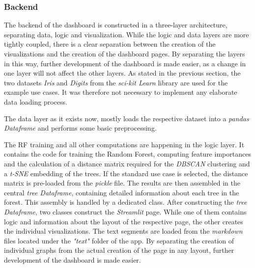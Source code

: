 \documentclass[a4paper, 12pt]{article}
\begin{document}
\subsubsection{Backend}
The backend of the dashboard is constructed in a three-layer architecture, separating data,
logic and visualization. While the logic and data layers are more tightly coupled, there is
a clear separation between the creation of the visualizations and the creation of the
dashboard pages. By separating the layers in this way, further development of the dashboard is
made easier, as a change in one layer will not affect the other layers. As stated in the
previous section, the two datasets \textit{Iris} and \textit{Digits} from the
\textit{sci-kit Learn} library are used for the example use cases. It was therefore not
necessary to implement any elaborate data loading process. \par
The data layer as it exists now, mostly loads the respective dataset into a
\textit{pandas Dataframe} and performs some basic preprocessing. \par
The RF training and all other computations are happening in the logic layer. It
contains the code for training the Random Forest, computing feature importances and the calculation
of a distance matrix required for the \textit{DBSCAN} clustering and a\textit{ t-SNE} embedding
of the trees. If the standard use case is selected, the distance matrix is pre-loaded from the
\textit{pickle} file. The results are then assembled in the central \textit{tree Dataframe}, containing
detailed information about each tree in the forest. This assembly is handled by a dedicated class.
After constructing the \textit{tree Dataframe}, two classes construct the \textit{Streamlit} page.
While one of them contains logic and information about the layout of the respective page, the other
creates the individual visualizations. The text segments are loaded from the \textit{markdown} files
located under the \textit{"text"} folder of the app. By separating the creation of individual graphs
from the actual creation of the page in any layout, further development of the dashboard is made
easier.
\end{document}
